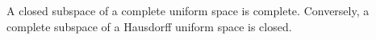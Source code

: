 A closed subspace of a complete uniform space is complete. Conversely, a complete subspace of a Hausdorff uniform space is closed.
